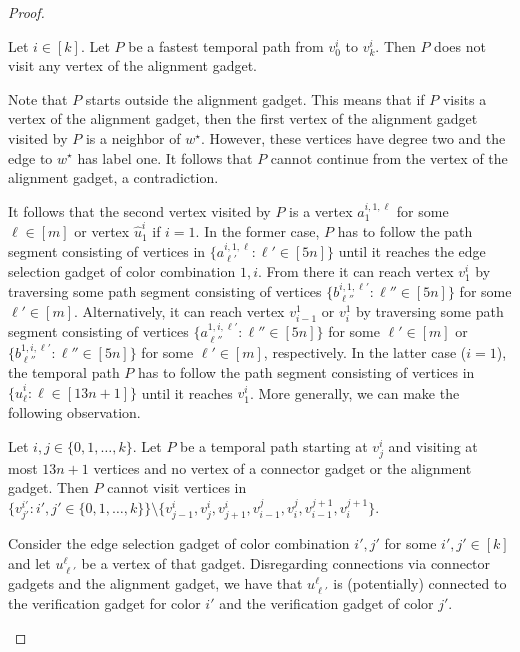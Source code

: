 \documentclass[a4paper,UKenglish,cleveref, autoref, thm-restate]{lipics-v2021}
\begin{document}
\begin{proof}
\begin{claim}\label{claim:11}
Let $i\in[k]$. Let $P$ be a fastest temporal path from $v_0^i$ to $v_k^i$. Then $P$ does not visit any vertex of the alignment gadget.
\end{claim}
\begin{claimproof}
    Note that $P$ starts outside the alignment gadget. This means that if $P$ visits a vertex of the alignment gadget, then the first vertex of the alignment gadget visited by $P$ is a neighbor of $w^\star$. However, these vertices have degree two and the edge to $w^\star$ has label one. It follows that $P$ cannot continue from the vertex of the alignment gadget, a contradiction.
\end{claimproof}

It follows that the second vertex visited by $P$ is a vertex $a^{i,1,\ell}_{1}$ for some $\ell\in[m]$ or vertex $\hat{u}_1^i$ if $i=1$. In the former case, $P$ has to follow the path segment consisting of vertices in $\{a^{i,1,\ell}_{\ell'} :  \ell'\in[5n]\}$ until it reaches the edge selection gadget of color combination $1,i$. From there it can reach vertex $v_1^i$ by traversing some path segment consisting of vertices $\{b^{i,1,\ell'}_{\ell''} :  \ell''\in[5n]\}$ for some $\ell'\in[m]$. Alternatively, it can reach vertex $v^1_{i-1}$ or $v^1_{i}$ by traversing some path segment consisting of vertices $\{a^{1,i,\ell'}_{\ell''} :  \ell''\in[5n]\}$ for some $\ell'\in[m]$ or $\{b^{1,i,\ell'}_{\ell''} :  \ell''\in[5n]\}$ for some $\ell'\in[m]$, respectively. In the latter case ($i=1$), the temporal path $P$ has to follow the path segment consisting of vertices in $\{\hat{u}^i_\ell :  \ell\in[13n+1]\}$ until it reaches $v^i_1$. More generally, we can make the following observation.
\begin{claim}\label{claim:12}
    Let $i,j\in\{0,1,\ldots,k\}$. Let $P$ be a temporal path starting at $v^i_j$ and visiting at most $13n+1$ vertices and no vertex of a connector gadget or the alignment gadget. Then $P$ cannot visit vertices in $\{v^{i'}_{j'} :  i',j'\in \{0,1,\ldots,k\}\}\setminus\{v^i_{j-1},v^i_j,v^i_{j+1},v^j_{i-1},v^j_i,v^{j+1}_{i-1},v^{j+1}_i\}$.
\end{claim}
\begin{claimproof}
    Consider the edge selection gadget of color combination $i',j'$ for some $i',j'\in[k]$ and let $u^\ell_{\ell'}$ be a vertex of that gadget. Disregarding connections via connector gadgets and the alignment gadget, we have that $u^\ell_{\ell'}$ is (potentially) connected to the verification gadget for color $i'$ and the verification gadget of color $j'$.

\end{claimproof}
\end{proof}
\end{document}
